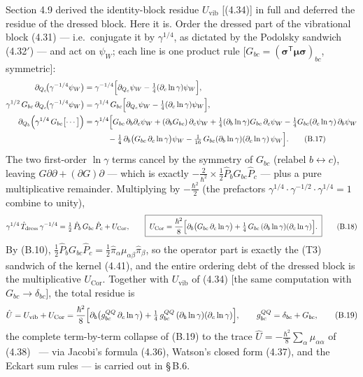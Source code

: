 Section 4.9 derived the identity-block residue $U_{\mathrm{vib}}$ [(4.34)] in full and deferred the residue of the dressed block. Here it is. Order the dressed part of the vibrational block (4.31) --- i.e.\ conjugate it by $\gamma^{1/4}$, as dictated by the Podolsky sandwich (4.32$'$) --- and act on $\psi_W$; each line is one product rule [$G_{bc}=(\boldsymbol\sigma^{\mathsf T}\boldsymbol\mu\boldsymbol\sigma)_{bc}$, symmetric]:
\begin{align}
\partial_{Q_c}\!\bigl(\gamma^{-1/4}\psi_W\bigr)&=\gamma^{-1/4}\Bigl[\partial_{Q_c}\psi_W-\tfrac14(\partial_c\ln\gamma)\psi_W\Bigr],\nonumber\\
\gamma^{1/2}\,G_{bc}\,\partial_{Q_c}\!\bigl(\gamma^{-1/4}\psi_W\bigr)&=\gamma^{1/4}\,G_{bc}\Bigl[\partial_{Q_c}\psi_W-\tfrac14(\partial_c\ln\gamma)\psi_W\Bigr],\nonumber\\
\partial_{Q_b}\Bigl(\gamma^{1/4}\,G_{bc}\bigl[\cdots\bigr]\Bigr)
&=\gamma^{1/4}\Bigl[G_{bc}\,\partial_b\partial_c\psi_W+(\partial_bG_{bc})\,\partial_c\psi_W
+\tfrac14(\partial_b\ln\gamma)G_{bc}\,\partial_c\psi_W-\tfrac14 G_{bc}(\partial_c\ln\gamma)\,\partial_b\psi_W\nonumber\\
&\qquad\quad-\tfrac14\,\partial_b\bigl(G_{bc}\,\partial_c\ln\gamma\bigr)\psi_W
-\tfrac{1}{16}\,G_{bc}(\partial_b\ln\gamma)(\partial_c\ln\gamma)\,\psi_W\Bigr]. \tag{B.17}
\end{align}
The two first-order $\ln\gamma$ terms cancel by the symmetry of $G_{bc}$ (relabel $b\leftrightarrow c$), leaving $G\partial\partial+(\partial G)\partial$ --- which is exactly $-\tfrac{2}{\hbar^2}\times\tfrac12\hat P_bG_{bc}\hat P_c$ --- plus a pure multiplicative remainder. Multiplying by $-\tfrac{\hbar^2}{2}$ (the prefactors $\gamma^{1/4}\cdot\gamma^{-1/2}\cdot\gamma^{1/4}=1$ combine to unity),
\begin{equation}
\gamma^{1/4}\,\hat T_{\mathrm{dress}}\,\gamma^{-1/4}
=\tfrac12\,\hat P_b\,G_{bc}\,\hat P_c+U_{\mathrm{Cor}},\qquad
\boxed{\;U_{\mathrm{Cor}}=\frac{\hbar^{2}}{8}\Bigl[\partial_b\bigl(G_{bc}\,\partial_c\ln\gamma\bigr)+\tfrac14\,G_{bc}\,(\partial_b\ln\gamma)(\partial_c\ln\gamma)\Bigr].\;} \tag{B.18}
\end{equation}
By (B.10), $\tfrac12\hat P_bG_{bc}\hat P_c=\tfrac12\hat\pi_\alpha\mu_{\alpha\beta}\hat\pi_\beta$, so the operator part is exactly the (T3) sandwich of the kernel (4.41), and the entire ordering debt of the dressed block is the multiplicative $U_{\mathrm{Cor}}$. Together with $U_{\mathrm{vib}}$ of (4.34) [the same computation with $G_{bc}\to\delta_{bc}$], the total residue is
\begin{equation}
\hat U=U_{\mathrm{vib}}+U_{\mathrm{Cor}}
=\frac{\hbar^{2}}{8}\Bigl[\partial_b\bigl(g^{QQ}_{bc}\,\partial_c\ln\gamma\bigr)+\tfrac14\,g^{QQ}_{bc}\,(\partial_b\ln\gamma)(\partial_c\ln\gamma)\Bigr],
\qquad g^{QQ}_{bc}=\delta_{bc}+G_{bc}, \tag{B.19}
\end{equation}
the complete term-by-term collapse of (B.19) to the trace $\hat U=-\tfrac{\hbar^2}{8}\sum_\alpha\mu_{\alpha\alpha}$ of (4.38)~\cite{watson1968} --- via Jacobi's formula (4.36), Watson's closed form (4.37), and the Eckart sum rules --- is carried out in \S\,B.6.

